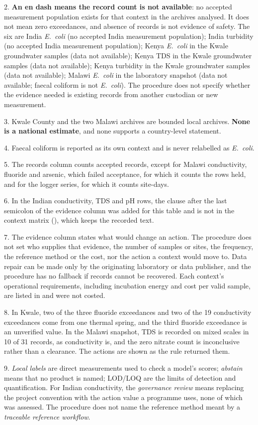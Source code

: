 \documentclass[10pt,letterpaper]{article}
\begin{document}
{\begin{flushleft}
2. \textbf{An en dash means the record count is not available}: no accepted measurement population exists for that context in the archives analysed. It does not mean zero exceedances, and absence of records is not evidence of safety. The six are India \textit{E.~coli} (no accepted India measurement population); India turbidity (no accepted India measurement population); Kenya \textit{E.~coli} in the Kwale groundwater samples (data not available); Kenya TDS in the Kwale groundwater samples (data not available); Kenya turbidity in the Kwale groundwater samples (data not available); Malawi \textit{E.~coli} in the laboratory snapshot (data not available; faecal coliform is not \textit{E.~coli}). The procedure does not specify whether the evidence needed is existing records from another custodian or new measurement.

3. Kwale County and the two Malawi archives are bounded local archives. \textbf{None is a national estimate}, and none supports a country-level statement.

4. Faecal coliform is reported as its own context and is never relabelled as \textit{E.~coli}.

5. The records column counts accepted records, except for Malawi conductivity, fluoride and arsenic, which failed acceptance, for which it counts the rows held, and for the logger series, for which it counts site-days.

6. In the Indian conductivity, TDS and pH rows, the clause after the last semicolon of the evidence column was added for this table and is not in the context matrix (), which keeps the recorded text.

7. The evidence column states what would change an action. The procedure does not set who supplies that evidence, the number of samples or sites, the frequency, the reference method or the cost, nor the action a context would move to. Data repair can be made only by the originating laboratory or data publisher, and the procedure has no fallback if records cannot be recovered. Each context's operational requirements, including incubation energy and cost per valid sample, are listed in  and were not costed.

8. In Kwale, two of the three fluoride exceedances and two of the 19 conductivity exceedances come from one thermal spring, and the third fluoride exceedance is an unverified value. In the Malawi snapshot, TDS is recorded on mixed scales in 10 of 31 records, as conductivity is, and the zero nitrate count is inconclusive rather than a clearance. The actions are shown as the rule returned them.

9. \textit{Local labels} are direct measurements used to check a model's scores; \textit{abstain} means that no product is named; LOD/LOQ are the limits of detection and quantification. For Indian conductivity, the \textit{governance review} means replacing the project convention with the action value a programme uses, none of which was assessed. The procedure does not name the reference method meant by a \textit{traceable reference workflow}.
\end{flushleft}
}
\linenumbers
\end{document}
